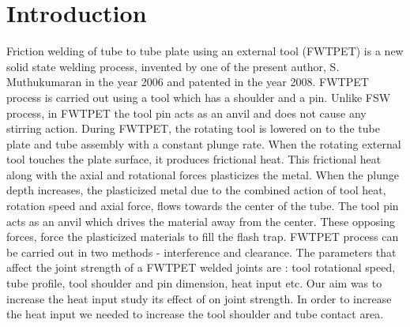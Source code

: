 \documentclass[3p]{elsarticle}
\begin{document}
\linenumbers
								
\section{Introduction}
\label{sec:Introduction}
Friction welding of tube to tube plate using an external tool (FWTPET) is a new solid state welding process, invented by one of the present author, S. Muthukumaran in the year 2006 and patented in the year 2008. FWTPET process is carried out using a tool which has a shoulder and a pin. Unlike FSW process, in FWTPET the tool pin acts as an anvil and does not cause any stirring action\cite{SenthilKumaran2011}. During FWTPET, the rotating tool is lowered on to the tube plate and tube assembly with a constant plunge rate. When the rotating external tool touches the plate surface, it produces frictional heat. This frictional heat along with the axial and rotational forces plasticizes the metal. When the plunge depth increases, the plasticized metal due to the combined action of tool heat, rotation speed and axial force, flows towards the center of the tube. The tool pin acts as an anvil which drives the material away from the center. These opposing forces, force the plasticized materials to fill the flash trap. FWTPET process can be carried out in two methods - interference and clearance.  The parameters that affect the joint strength of a FWTPET welded joints are : tool rotational speed, tube profile, tool shoulder and pin dimension, heat input etc. Our aim was to increase the heat input study its effect of on joint strength. In order to increase the heat input we needed to increase the tool shoulder and tube contact area. 
\end{document}
